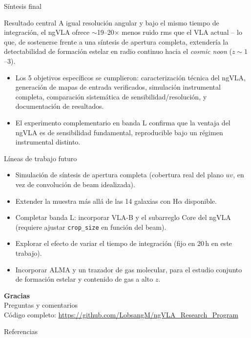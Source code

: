 \documentclass[12pt,aspectratio=169]{beamer}
\begin{document}
\begin{frame}{Síntesis final}
    \begin{alertblock}{Resultado central}
        A igual resolución angular y bajo el mismo tiempo de integración,
        el ngVLA ofrece $\sim$19--20$\times$ menos ruido rms que el VLA
        actual -- lo que, de sostenerse frente a una síntesis de apertura
        completa, extendería la detectabilidad de formación estelar en
        radio continuo hacia el \emph{cosmic noon} ($z\sim1$--3).
    \end{alertblock}
    \begin{itemize}
        \item Los 5 objetivos específicos se cumplieron: caracterización
        técnica del ngVLA, generación de mapas de entrada verificados,
        simulación instrumental completa, comparación sistemática de
        sensibilidad/resolución, y documentación de resultados.
        \item El experimento complementario en banda L confirma que la
        ventaja del ngVLA es de sensibilidad fundamental, reproducible
        bajo un régimen instrumental distinto.
    \end{itemize}
\end{frame}

\begin{frame}{Líneas de trabajo futuro}
    \begin{itemize}
        \item Simulación de síntesis de apertura completa (cobertura real
        del plano $uv$, en vez de convolución de beam idealizada).
        \item Extender la muestra más allá de las 14 galaxias con
        H$\alpha$ disponible.
        \item Completar banda L: incorporar VLA-B y el subarreglo Core
        del ngVLA (requiere ajustar \texttt{crop\_size} en función del
        beam).
        \item Explorar el efecto de variar el tiempo de integración
        (fijo en 20\,h en este trabajo).
        \item Incorporar ALMA y un trazador de gas molecular, para el
        estudio conjunto de formación estelar y contenido de gas a alto
        $z$.
    \end{itemize}
\end{frame}

\begin{frame}
    \centering
    \Large \textbf{Gracias}\\[0.3cm]
    \normalsize Preguntas y comentarios\\[1cm]
    \small Código completo:
    \url{https://github.com/LobsangM/ngVLA_Research_Program}
\end{frame}

\begin{frame}[allowframebreaks]{Referencias}
    \tiny
    
    
\end{frame}
\end{document}
